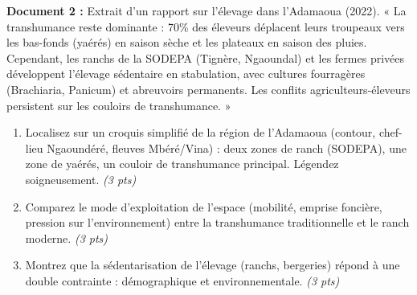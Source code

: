 \documentclass[11pt]{article}
\begin{document}
\begin{exercice}
\textbf{Document 2 :} Extrait d'un rapport sur l'élevage dans l'Adamaoua (2022).
« La transhumance reste dominante : 70\% des éleveurs déplacent leurs troupeaux vers les bas-fonds (yaérés) en saison sèche et les plateaux en saison des pluies. Cependant, les ranchs de la SODEPA (Tignère, Ngaoundal) et les fermes privées développent l'élevage sédentaire en stabulation, avec cultures fourragères (Brachiaria, Panicum) et abreuvoirs permanents. Les conflits agriculteurs-éleveurs persistent sur les couloirs de transhumance. »

\begin{enumerate}
    \item Localisez sur un croquis simplifié de la région de l'Adamaoua (contour, chef-lieu Ngaoundéré, fleuves Mbéré/Vina) : deux zones de ranch (SODEPA), une zone de yaérés, un couloir de transhumance principal. Légendez soigneusement. \textit{(3 pts)}
    \item Comparez le mode d'exploitation de l'espace (mobilité, emprise foncière, pression sur l'environnement) entre la transhumance traditionnelle et le ranch moderne. \textit{(3 pts)}
    \item Montrez que la sédentarisation de l'élevage (ranchs, bergeries) répond à une double contrainte : démographique et environnementale. \textit{(3 pts)}
\end{enumerate}
\end{exercice}
\end{document}
